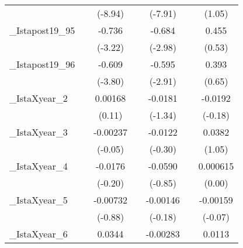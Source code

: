 {\begin{tabular}{l*{6}{c}}
            &                     &     (-8.94)         &                     &     (-7.91)         &                     &      (1.05)         \\
[1em]
\_Istapost19\_95&                     &      -0.736\sym{**} &                     &      -0.684\sym{**} &                     &       0.455         \\
            &                     &     (-3.22)         &                     &     (-2.98)         &                     &      (0.53)         \\
[1em]
\_Istapost19\_96&                     &      -0.609\sym{***}&                     &      -0.595\sym{**} &                     &       0.393         \\
            &                     &     (-3.80)         &                     &     (-2.91)         &                     &      (0.65)         \\
[1em]
\_IstaXyear\_2&                     &     0.00168         &                     &     -0.0181         &                     &     -0.0192         \\
            &                     &      (0.11)         &                     &     (-1.34)         &                     &     (-0.18)         \\
[1em]
\_IstaXyear\_3&                     &    -0.00237         &                     &     -0.0122         &                     &      0.0382         \\
            &                     &     (-0.05)         &                     &     (-0.30)         &                     &      (1.05)         \\
[1em]
\_IstaXyear\_4&                     &     -0.0176         &                     &     -0.0590         &                     &    0.000615         \\
            &                     &     (-0.20)         &                     &     (-0.85)         &                     &      (0.00)         \\
[1em]
\_IstaXyear\_5&                     &    -0.00732         &                     &    -0.00146         &                     &    -0.00159         \\
            &                     &     (-0.88)         &                     &     (-0.18)         &                     &     (-0.07)         \\
[1em]
\_IstaXyear\_6&                     &      0.0344\sym{*}  &                     &    -0.00283         &                     &      0.0113         \\

\end{tabular}}
